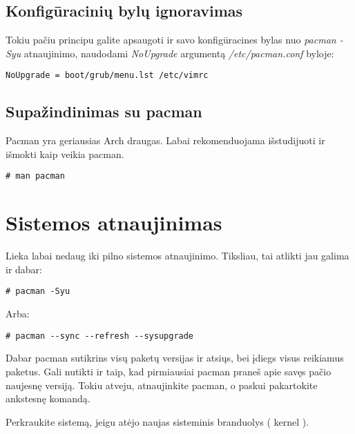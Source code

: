     \subsection{Konfigūracinių bylų ignoravimas}

      Tokiu pačiu principu galite apsaugoti ir savo konfigūracines
      bylas nuo \textsl{pacman -Syu} atnaujinimo, naudodami
      \textsl{NoUpgrade} argumentą \textsl{/etc/pacman.conf} byloje:

      \begin{verbatim}
NoUpgrade = boot/grub/menu.lst /etc/vimrc
      \end{verbatim}

    \subsection{Supažindinimas su pacman}


      Pacman yra geriausias Arch draugas. Labai rekomenduojama
      išstudijuoti ir išmokti kaip veikia pacman.

      \begin{verbatim}
# man pacman
      \end{verbatim}

    \section{Sistemos atnaujinimas}

      Lieka labai nedaug iki pilno sistemos atnaujinimo. Tiksliau, tai
      atlikti jau galima ir dabar:

      \begin{verbatim}
# pacman -Syu
      \end{verbatim}

      Arba:

      \begin{verbatim}
# pacman --sync --refresh --sysupgrade
      \end{verbatim}

      Dabar pacman sutikrins visų paketų versijas ir atsiųs, bei
      įdiegs visus reikiamus paketus. Gali nutikti ir taip, kad
      pirmiausiai pacman praneš apie savęs pačio naujesnę
      versiją. Tokiu atveju, atnaujinkite pacman, o paskui pakartokite
      ankstesnę komandą. 

      Perkraukite sistemą, jeigu atėjo naujas sisteminis branduolys (
      kernel ).

